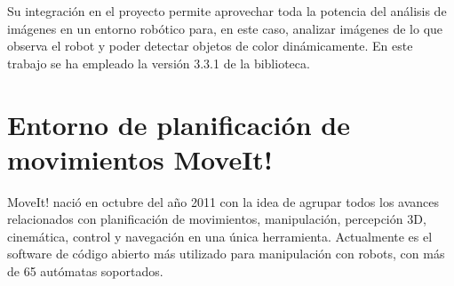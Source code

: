 \documentclass[12pt,spanish,chapterprefix, numbers=noenddot]{book}
\numberwithin{equation}{section}
\numberwithin{figure}{section}
\begin{document}
Su integración en el proyecto permite aprovechar toda la potencia del análisis de imágenes en un entorno robótico para, en este caso, analizar imágenes de lo que observa el robot y poder detectar objetos de color dinámicamente. En este trabajo se ha empleado la versión 3.3.1 de la biblioteca. 

\section{Entorno de planificación de movimientos MoveIt!}
MoveIt! nació en octubre del año 2011 con la idea de agrupar todos los avances relacionados con planificación de movimientos, manipulación, percepción 3D, cinemática, control y navegación en una única herramienta. Actualmente es el software de código abierto más utilizado para manipulación con robots, con más de 65 autómatas soportados. 
\end{document}
